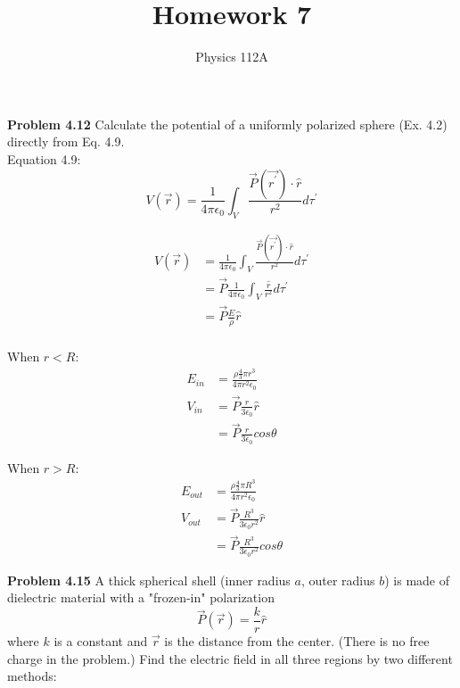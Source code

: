 \documentclass{article}
\title{Homework 7}
\author{Physics 112A}
\date{}
\begin{document}
\maketitle

\textbf{Problem 4.12}
Calculate the potential of a uniformly polarized sphere (Ex. 4.2) directly from
Eq. 4.9. \\

Equation 4.9:
$$ V(\vec{r}) = \frac{1}{4 \pi \epsilon_0} \int_V \frac{\vec{P}(\vec{r^\prime}) \cdot \hat{r}}{r^2} d\tau^\prime  $$

\begin{equation*}
\begin{split}
	V(\vec{r}) & = \frac{1}{4 \pi \epsilon_0} \int_V \frac{\vec{P}(\vec{r^\prime}) \cdot \hat{r}}{r^2} d\tau^\prime \\
	& = \vec{P} \frac{1}{4 \pi \epsilon_0} \int_V \frac{\hat{r}}{r^2} d\tau^\prime \\
	& = \vec{P} \frac{E}{\rho} \hat{r} \\
\end{split}
\end{equation*}

When $r < R$:
\begin{equation*}
\begin{split}
	E_{in} & = \frac{\rho \frac{4}{3} \pi r^3}{4 \pi r^2 \epsilon_0} \\
	V_{in} & = \vec{P} \frac{r}{3 \epsilon_0} \hat{r} \\
	& = \boxed{\vec{P} \frac{r}{3 \epsilon_0} cos\theta}
\end{split}
\end{equation*}

When $r > R$:
\begin{equation*}
\begin{split}
	E_{out} & = \frac{\rho \frac{4}{3} \pi R^3}{4 \pi r^2 \epsilon_0} \\
	V_{out} & = \vec{P} \frac{R^3}{3 \epsilon_0 r^2} \hat{r} \\
	& = \boxed{\vec{P} \frac{R^3}{3 \epsilon_0 r^2} cos\theta}
\end{split}
\end{equation*}

\textbf{Problem 4.15}
A thick spherical shell (inner radius $a$, outer radius $b$) is made of dielectric material with a "frozen-in" polarization
$$ \vec{P} (\vec{r}) = \frac{k}{r} \hat{r} $$
where $k$ is a constant and $\vec{r}$ is the distance from the center.
(There is no free charge in the problem.)
Find the electric field in all three regions by two different methods:
\end{document}
